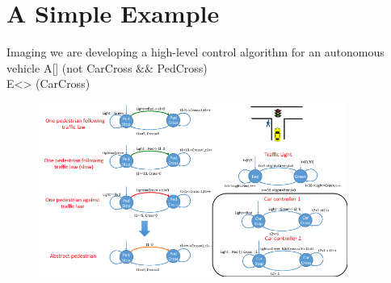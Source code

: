 \section{A Simple Example}
Imaging we are developing a high-level control algorithm for an autonomous vehicle
\textsf{A[] (not CarCross $\&\&$ PedCross)}\\
\textsf{E<> (CarCross)}
\begin{figure}[!t]
		\centering
		\includegraphics[width=0.9\textwidth]{figs/example.png}
		\caption{\small }
		\label{fig:example}
\end{figure}